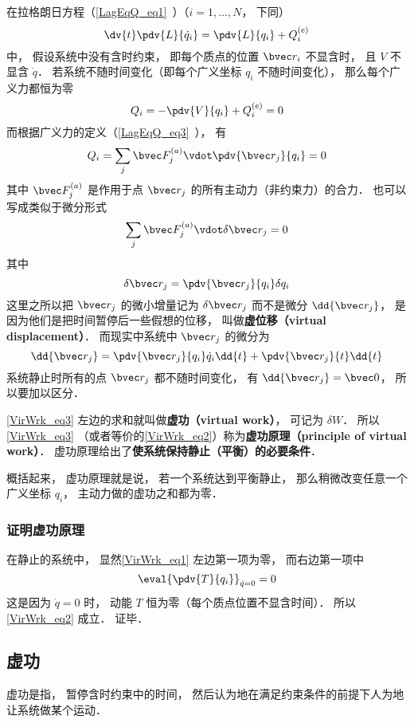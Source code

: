 
\begin{issues}
\issueTODO
\end{issues}


在拉格朗日方程（\autoref{LagEqQ_eq1}~）（$i=1,\dots,N$， 下同）
\begin{equation}\label{VirWrk_eq1}
\dv{t} \pdv{L}{\dot q_i} = \pdv{L}{q_i} + Q_i^{(e)}
\end{equation}
中， 假设系统中没有含时约束， 即每个质点的位置 $\bvec r_i$ 不显含时， 且 $V$ 不显含 $\dot q$． 若系统不随时间变化（即每个广义坐标 $q_i$ 不随时间变化）， 那么每个广义力都恒为零
\begin{equation}\label{VirWrk_eq2}
Q_i = -\pdv{V}{q_i} + Q_i^{(e)} = 0
\end{equation}
而根据广义力的定义（\autoref{LagEqQ_eq3}~）， 有
\begin{equation}
Q_i = \sum_j \bvec F_j^{(a)} \vdot \pdv{\bvec r_j}{q_i} = 0
\end{equation}
其中 $\bvec F_j^{(a)}$ 是作用于点 $\bvec r_j$ 的所有主动力（非约束力）的合力． 也可以写成类似于微分形式
\begin{equation}\label{VirWrk_eq3}
\sum_j \bvec F_j^{(a)} \vdot \delta \bvec r_j = 0
\end{equation}
其中
\begin{equation}
\delta \bvec r_j = \pdv{\bvec r_j}{q_i}\delta{q_i}
\end{equation}
这里之所以把 $\bvec r_j$ 的微小增量记为 $\delta \bvec r_j$ 而不是微分 $\dd{\bvec r_j}$， 是因为他们是把时间暂停后一些假想的位移， 叫做\textbf{虚位移（virtual displacement）}． 而现实中系统中 $\bvec r_j$ 的微分为
\begin{equation}
\dd{\bvec r_j} = \pdv{\bvec r_j}{q_i}\dot{q}_i\dd{t} + \pdv{\bvec r_j}{t}\dd{t}
\end{equation}
系统静止时所有的点 $\bvec r_j$ 都不随时间变化， 有 $\dd{\bvec r_j} = \bvec 0$， 所以要加以区分．

\autoref{VirWrk_eq3} 左边的求和就叫做\textbf{虚功（virtual work）}， 可记为 $\delta W$． 所以\autoref{VirWrk_eq3} （或者等价的\autoref{VirWrk_eq2}）称为\textbf{虚功原理（principle of virtual work）}． 虚功原理给出了\textbf{使系统保持静止（平衡）的必要条件}．

概括起来， 虚功原理就是说， 若一个系统达到平衡静止， 那么稍微改变任意一个广义坐标 $q_i$， 主动力做的虚功之和都为零．

\subsubsection{证明虚功原理}
在静止的系统中， 显然\autoref{VirWrk_eq1} 左边第一项为零， 而右边第一项中
\begin{equation}
\eval{\pdv{T}{q_i}}_{\dot q = 0} = 0
\end{equation}
这是因为 $\dot q = 0$ 时， 动能 $T$ 恒为零（每个质点位置不显含时间）． 所以\autoref{VirWrk_eq2} 成立． 证毕．


\subsection{虚功}\label{VirWrk_sub1}
虚功是指， 暂停含时约束中的时间， 然后认为地在满足约束条件的前提下人为地让系统做某个运动．
